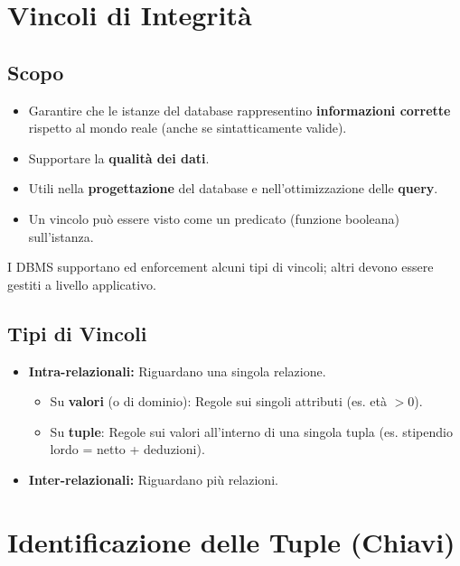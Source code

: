 \documentclass{article}
\begin{document}
	\section{Vincoli di Integrità}
	
	\subsection{Scopo}
	\begin{itemize}
		\item Garantire che le istanze del database rappresentino \textbf{informazioni corrette} rispetto al mondo reale (anche se sintatticamente valide).
		\item Supportare la \textbf{qualità dei dati}.
		\item Utili nella \textbf{progettazione} del database e nell'ottimizzazione delle \textbf{query}.
		\item Un vincolo può essere visto come un predicato (funzione booleana) sull'istanza.
	\end{itemize}
	I DBMS supportano ed enforcement alcuni tipi di vincoli; altri devono essere gestiti a livello applicativo.
	
	\subsection{Tipi di Vincoli}
	\begin{itemize}
		\item \textbf{Intra-relazionali:} Riguardano una singola relazione.
		\begin{itemize}
			\item Su \textbf{valori} (o di dominio): Regole sui singoli attributi (es. età $> 0$).
			\item Su \textbf{tuple}: Regole sui valori all'interno di una singola tupla (es. stipendio lordo = netto + deduzioni).
		\end{itemize}
		\item \textbf{Inter-relazionali:} Riguardano più relazioni.
	\end{itemize}
	
	\section{Identificazione delle Tuple (Chiavi)}
	
\end{document}
